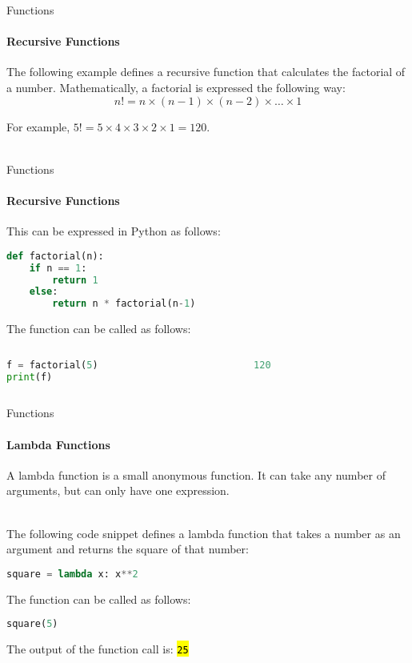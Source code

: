\documentclass[
    aspectratio=169, 
    usepdftitle=false, 
    xcolor={dvipsnames},
    hyperref={
        colorlinks,
        linkcolor=black,
        urlcolor=blue}
    ]{beamer}
\let\OldTexttt\texttt
\renewcommand{\texttt}[1]{\OldTexttt{\hl{#1}}}%
\begin{document}
\begin{frame}[fragile]{Functions}
    \framesubtitle{Recursive Functions}

    The following example defines a recursive function that calculates the factorial of a number. Mathematically, a factorial is expressed the following way: 
    \begin{equation*}
        n! = n \times (n-1) \times (n-2) \times \dots \times 1
    \end{equation*}

    For example, $5! = 5 \times 4 \times 3 \times 2 \times 1 = 120$.\\~\

\end{frame}
\begin{frame}[fragile]{Functions}
    \framesubtitle{Recursive Functions}

    This can be expressed in Python as follows:

    \begin{lstlisting}[language=Python]
def factorial(n):
    if n == 1:
        return 1
    else:
        return n * factorial(n-1)
    \end{lstlisting}

    The function can be called as follows:

    \begin{columns}
        \begin{column}{0.4\textwidth}
            \begin{lstlisting}[language=Python]
f = factorial(5)
print(f)
            \end{lstlisting}
        \end{column}
        \begin{column}{0.4\textwidth}
            \begin{lstlisting}[style=output, language=Python]
120
            \end{lstlisting}
        \end{column}
    \end{columns}
\end{frame}

\begin{frame}[fragile]{Functions}
    \framesubtitle{Lambda Functions}
    A lambda function is a small anonymous function. It can take any number of arguments, but can only have one expression.\\~\

    The following code snippet defines a lambda function that takes a number as an argument and returns the square of that number:

    \begin{lstlisting}[language=Python]
square = lambda x: x**2
    \end{lstlisting}

    The function can be called as follows:

    \begin{lstlisting}[language=Python]
square(5)
    \end{lstlisting}

    The output of the function call is: \texttt{25}
\end{frame}
\end{document}
